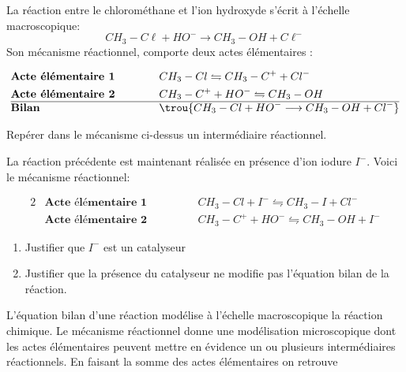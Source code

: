   La réaction entre le chlorométhane et l'ion hydroxyde s'écrit à l'échelle macroscopique: $$CH_3-C\ell + HO^- \longrightarrow CH_3-OH + C\ell^-$$
 Son mécanisme réactionnel, comporte deux actes élémentaires :
 

\begin{alignat*}{2}
    &\textbf{Acte élémentaire 1} \quad \quad \quad &&CH_3-Cl \leftrightharpoons CH_3-C^+ + Cl^- \\
    &\textbf{Acte élémentaire 2} \quad \quad \quad &&CH_3-C^+ + HO^- \leftrightharpoons CH_3-OH \\
    \hline 
    &\textbf{Bilan} \quad &&\trou{CH_3-Cl + HO^- \longrightarrow CH_3-OH + Cl^-}
\end{alignat*}


 Repérer dans le mécanisme ci-dessus un intermédiaire réactionnel.


La réaction précédente est maintenant réalisée en présence d'ion iodure $I^-$. Voici le mécanisme réactionnel: 

\begin{alignat*}{2}
    &\textbf{Acte élémentaire 1} \quad \quad \quad &&CH_3-Cl + I^-\leftrightharpoons CH_3-I + Cl^- \\
    &\textbf{Acte élémentaire 2} \quad \quad \quad &&CH_3-C^+ + HO^- \leftrightharpoons CH_3-OH + I^-
    \end{alignat*}

\begin{enumerate}
	\item Justifier que $I^-$ est un catalyseur
	\item Justifier que la présence du catalyseur ne modifie pas l'équation bilan de la réaction.
\end{enumerate}

 L'équation bilan d'une réaction modélise à l'échelle macroscopique la réaction chimique. Le mécanisme réactionnel donne une modélisation microscopique dont les actes élémentaires peuvent mettre en évidence un ou plusieurs intermédiaires réactionnels.
En faisant la somme  des actes élémentaires on retrouve 

